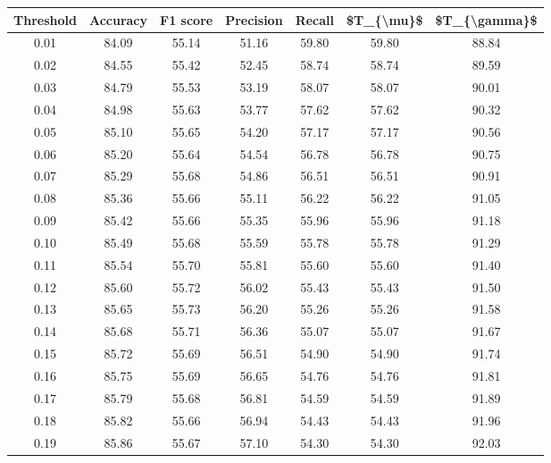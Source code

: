 \begin{tabular}{|c|c|c|c|c|c|c|}
\hline
 Threshold &  Accuracy &  F1 score &  Precision &  Recall &  \$T\_\{\textbackslash mu\}\$ &  \$T\_\{\textbackslash gamma\}\$ \\
\hline
      0.01 &     84.09 &     55.14 &      51.16 &   59.80 &      59.80 &         88.84 \\
      0.02 &     84.55 &     55.42 &      52.45 &   58.74 &      58.74 &         89.59 \\
      0.03 &     84.79 &     55.53 &      53.19 &   58.07 &      58.07 &         90.01 \\
      0.04 &     84.98 &     55.63 &      53.77 &   57.62 &      57.62 &         90.32 \\
      0.05 &     85.10 &     55.65 &      54.20 &   57.17 &      57.17 &         90.56 \\
      0.06 &     85.20 &     55.64 &      54.54 &   56.78 &      56.78 &         90.75 \\
      0.07 &     85.29 &     55.68 &      54.86 &   56.51 &      56.51 &         90.91 \\
      0.08 &     85.36 &     55.66 &      55.11 &   56.22 &      56.22 &         91.05 \\
      0.09 &     85.42 &     55.66 &      55.35 &   55.96 &      55.96 &         91.18 \\
      0.10 &     85.49 &     55.68 &      55.59 &   55.78 &      55.78 &         91.29 \\
      0.11 &     85.54 &     55.70 &      55.81 &   55.60 &      55.60 &         91.40 \\
      0.12 &     85.60 &     55.72 &      56.02 &   55.43 &      55.43 &         91.50 \\
      0.13 &     85.65 &     55.73 &      56.20 &   55.26 &      55.26 &         91.58 \\
      0.14 &     85.68 &     55.71 &      56.36 &   55.07 &      55.07 &         91.67 \\
      0.15 &     85.72 &     55.69 &      56.51 &   54.90 &      54.90 &         91.74 \\
      0.16 &     85.75 &     55.69 &      56.65 &   54.76 &      54.76 &         91.81 \\
      0.17 &     85.79 &     55.68 &      56.81 &   54.59 &      54.59 &         91.89 \\
      0.18 &     85.82 &     55.66 &      56.94 &   54.43 &      54.43 &         91.96 \\
      0.19 &     85.86 &     55.67 &      57.10 &   54.30 &      54.30 &         92.03 \\

\end{tabular}
